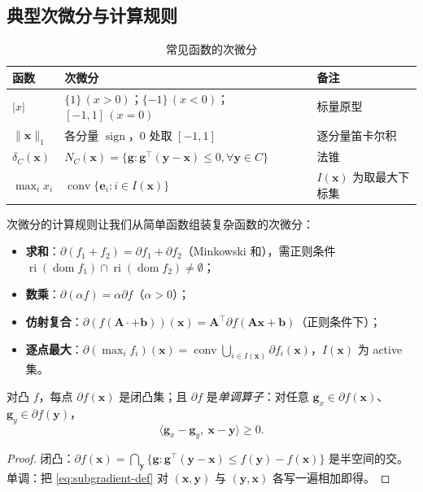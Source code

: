 \subsection{典型次微分与计算规则}
\label{subsec:cvx-subgrad-calc}

\begin{table}[H]\centering\small
\caption{常见函数的次微分}
\label{tab:subdiff}
\begin{tabular}{lll}
\toprule
函数 & 次微分 & 备注 \\
\midrule
$|x|$ & $\{1\}\,(x>0)$；$\{-1\}\,(x<0)$；$[-1,1]\,(x=0)$ & 标量原型 \\
$\|\mathbf x\|_1$ & 各分量 $\operatorname{sign}$，$0$ 处取 $[-1,1]$ & 逐分量笛卡尔积 \\
$\delta_C(\mathbf x)$ & $N_C(\mathbf x)=\{\mathbf g:\mathbf g^\top(\mathbf y-\mathbf x)\le0,\forall\mathbf y\in C\}$ & 法锥 \\
$\max_i x_i$ & $\operatorname{conv}\{\mathbf e_i:i\in I(\mathbf x)\}$ & $I(\mathbf x)$ 为取最大下标集 \\
\bottomrule
\end{tabular}
\end{table}

次微分的计算规则让我们从简单函数组装复杂函数的次微分：
\begin{itemize}
  \item \textbf{求和}：$\partial(f_1+f_2)=\partial f_1+\partial f_2$（Minkowski 和），需正则条件 $\operatorname{ri}(\operatorname{dom}f_1)\cap\operatorname{ri}(\operatorname{dom}f_2)\neq\emptyset$；
  \item \textbf{数乘}：$\partial(\alpha f)=\alpha\partial f$（$\alpha>0$）；
  \item \textbf{仿射复合}：$\partial(f(\mathbf A\cdot+\mathbf b))(\mathbf x)=\mathbf A^\top\partial f(\mathbf A\mathbf x+\mathbf b)$（正则条件下）；
  \item \textbf{逐点最大}：$\partial(\max_i f_i)(\mathbf x)=\operatorname{conv}\bigcup_{i\in I(\mathbf x)}\partial f_i(\mathbf x)$，$I(\mathbf x)$ 为 active 集。
\end{itemize}

\begin{proposition}[次微分是闭凸集且单调]\label{prop:subdiff-monotone}
对凸 $f$，每点 $\partial f(\mathbf x)$ 是闭凸集；且 $\partial f$ 是\emph{单调算子}：对任意 $\mathbf g_x\in\partial f(\mathbf x)$、$\mathbf g_y\in\partial f(\mathbf y)$，
\begin{equation}
  \langle\mathbf g_x-\mathbf g_y,\ \mathbf x-\mathbf y\rangle\ge0.
  \label{eq:subdiff-monotone}
\end{equation}
\end{proposition}
\begin{proof}
闭凸：$\partial f(\mathbf x)=\bigcap_{\mathbf y}\{\mathbf g:\mathbf g^\top(\mathbf y-\mathbf x)\le f(\mathbf y)-f(\mathbf x)\}$ 是半空间的交。单调：把 \cref{eq:subgradient-def} 对 $(\mathbf x,\mathbf y)$ 与 $(\mathbf y,\mathbf x)$ 各写一遍相加即得。
\end{proof}

